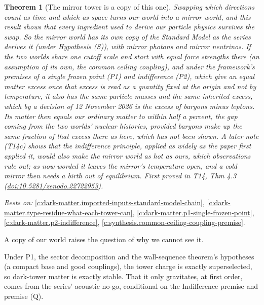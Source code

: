 \documentclass[11pt]{article}
\newtheorem{theorem}{Theorem}[section]
\theoremstyle{definition}
\theoremstyle{plain}
\begin{document}
\begin{theorem}[The mirror tower is a copy of this one]\label{c:dark-matter.mirror-tower-copy-one}
Swapping which directions count as time and which as space turns our world into a mirror world, and this result shows that every ingredient used to derive our particle physics survives the swap. So the mirror world has its own copy of the Standard Model as the series derives it (under Hypothesis (S)), with mirror photons and mirror neutrinos. If the two worlds share one cutoff scale and start with equal force strengths there (an assumption of its own, the common ceiling coupling), and under the framework's premises of a single frozen point (P1) and indifference (P2), which give an equal matter excess once that excess is read as a quantity fixed at the origin and not by temperature, it also has the same particle masses and the same inherited excess, which by a decision of 12 November 2026 is the excess of baryons minus leptons. Its matter then equals our ordinary matter to within half a percent, the gap coming from the two worlds' nuclear histories, provided baryons make up the same fraction of that excess there as here, which has not been shown. A later note (T14c) shows that the indifference principle, applied as widely as the paper first applied it, would also make the mirror world as hot as ours, which observations rule out; as now worded it leaves the mirror's temperature open, and a cold mirror then needs a birth out of equilibrium.
\emph{First proved in} T14, Thm 4.3 (\href{https://doi.org/10.5281/zenodo.22722953}{doi:10.5281/zenodo.22722953}).
\end{theorem}
\noindent\emph{Rests on:} \ref{c:dark-matter.imported-inputs-standard-model-chain}, \ref{c:dark-matter.type-residue-what-each-tower-can}, \ref{c:dark-matter.p1-single-frozen-point}, \ref{c:dark-matter.p2-indifference}, \ref{c:synthesis.common-ceiling-coupling-premise}.

A copy of our world raises the question of why we cannot see it.

Under P1, the sector decomposition and the wall-sequence theorem's hypotheses (a compact base and good couplings), the tower charge is exactly superselected, so dark-tower matter is exactly stable. That it only gravitates, at first order, comes from the series' acoustic no-go, conditional on the Indifference premise and premise (Q).
\end{document}
